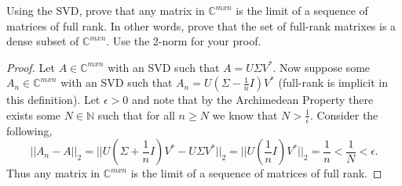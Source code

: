 \documentclass[12pt]{article}
\makeatletter
\theoremstyle{homework}
\newenvironment{exercise}[1]
{\def\@currentlabel{#1}\exercisecore}
{\endexercisecore}
\newcommand{\Nats}{\ensuremath{\mathbb N}}
\newcommand{\Cplx}{\ensuremath{\mathbb C}}
\let\NN\Nats
\let\CC\Cplx
\makeatother
\begin{document}
\begin{exercise}{5.2} Using the SVD, prove that any matrix in $\CC^{mxn}$ is the limit of a sequence of matrices 
  of full rank. In other words, prove that the set of full-rank matrixes is a dense subset of $\CC^{mxn}$. Use 
  the 2-norm for your proof.\\
  \begin{proof} Let $A \in \CC^{mxn}$ with an SVD such that $A = U\Sigma V^*$. Now suppose some $A_n \in \CC^{mxn}$ with an SVD such that $A_n = U(\Sigma - \frac{1}{n}I)V^*$ (full-rank is implicit in this definition). 
    Let $\epsilon > 0$ and note that by the Archimedean Property there exists some $N \in \NN$ such that for all $n \geq N$ we know that $N > \frac{1}{\epsilon}$. Consider the following, 
    \begin{equation*}
      ||A_n - A||_2 = ||U\left(\Sigma + \frac{1}{n}I\right)V^* - U\Sigma V^*||_2  = ||U\left(\frac{1}{n}I\right)V^*||_2 = \frac{1}{n} < \frac{1}{N} < \epsilon.
    \end{equation*}
    Thus any matrix in $\CC^{mxn}$ is the limit of a sequence of matrices 
    of full rank.

  \end{proof}

  
\end{exercise}
\end{document}
